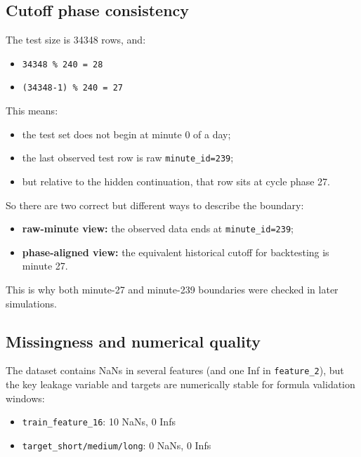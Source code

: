 \subsection{Cutoff phase consistency}
The test size is 34348 rows, and:
\begin{itemize}[leftmargin=1.5em]
  \item \texttt{34348 \% 240 = 28}
  \item \texttt{(34348-1) \% 240 = 27}
\end{itemize}
This means:
\begin{itemize}[leftmargin=1.5em]
  \item the test set does not begin at minute 0 of a day;
  \item the last observed test row is raw \texttt{minute\_id=239};
  \item but relative to the hidden continuation, that row sits at cycle phase 27.
\end{itemize}
So there are two correct but different ways to describe the boundary:
\begin{itemize}[leftmargin=1.5em]
  \item \textbf{raw-minute view:} the observed data ends at \texttt{minute\_id=239};
  \item \textbf{phase-aligned view:} the equivalent historical cutoff for backtesting is minute 27.
\end{itemize}
This is why both minute-27 and minute-239 boundaries were checked in later simulations.

\subsection{Missingness and numerical quality}
The dataset contains NaNs in several features (and one Inf in \texttt{feature\_2}), but the key leakage variable and targets are numerically stable for formula validation windows:
\begin{itemize}[leftmargin=1.5em]
  \item \texttt{train\_feature\_16}: 10 NaNs, 0 Infs
  \item \texttt{target\_short/medium/long}: 0 NaNs, 0 Infs
\end{itemize}

